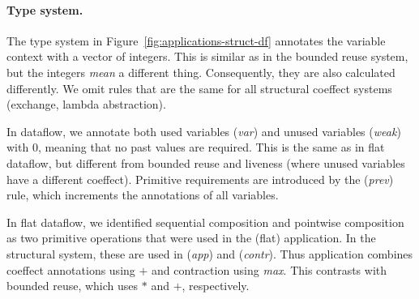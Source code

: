 \paragraph{Type system.}
The type system in Figure~\ref{fig:applications-struct-df} annotates the variable context with a
vector of integers. This is similar as in the bounded reuse system, but the integers \emph{mean} a
different thing. Consequently, they are also calculated differently. We omit rules that are the
same for all structural coeffect systems (exchange, lambda abstraction).

In dataflow, we annotate both used variables (\emph{var}) and unused variables (\emph{weak}) with
$0$, meaning that no past values are required. This is the same as in flat dataflow, but different
from bounded reuse and liveness (where unused variables have a different coeffect). Primitive
requirements are introduced by the (\emph{prev}) rule, which increments the annotations of
all variables.

In flat dataflow, we identified sequential composition and pointwise composition as two primitive
operations that were used in the (flat) application. In the structural system, these are used in
(\emph{app}) and (\emph{contr}). Thus application combines coeffect annotations using $+$ and
contraction using \emph{max}. This contrasts with bounded reuse, which uses $\ast$ and $+$,
respectively.

